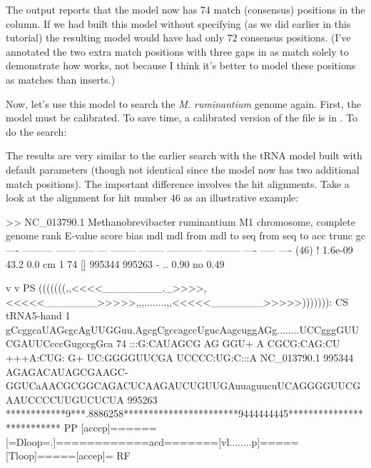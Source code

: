 The output reports that the model now has 74 match (consensus)
positions in the  column. If we had built this model
without specifying  (as we did earlier in this tutorial)
the resulting model would have had only 72 consensus positions.
(I've annotated the two extra match positions with three gaps in
 as match solely to demonstrate how
 works, not because I think it's better to model these
positions as matches than inserts.)

Now, let's use this model to search the \emph{M. ruminantium} genome
again. First, the model must be calibrated. To save time, a calibrated
version of the file is in . To do the
search:


The results are very similar to the earlier search with the
tRNA model built with default  parameters (though not
identical since the model now has two additional match positions). The
important difference involves the hit alignments. Take a look at the
alignment for hit number 46 as an illustrative example:

\newpage

\begin{widesreoutput}
>> NC_013790.1  Methanobrevibacter ruminantium M1 chromosome, complete genome
 rank     E-value  score  bias mdl mdl from   mdl to       seq from      seq to       acc trunc   gc
 ----   --------- ------ ----- --- -------- --------    ----------- -----------      ---- ----- ----
 (46) !   1.6e-09   43.2   0.0  cm        1       74 []      995344      995263 - .. 0.90    no 0.49

                                 v          v                                                            PS
                     (((((((,,<<<<________._>>>>,<<<<<_______>>>>>,,,........,,<<<<<_______>>>>>))))))): CS
   tRNA5-hand      1 gCcggcaUAGcgcAgUUGGuu.AgcgCgccagccUgucAagcuggAGg........UCCgggGUUCGAUUCcccGugccgGca 74    
                     :::G:CAUAGCG AG  GGU+ A CGCG:CAG:CU +++A:CUG: G+        UC:GGGGUUCGA UCCCC:UG:C:::A
  NC_013790.1 995344 AGAGACAUAGCGAAGC-GGUCaAACGCGGCAGACUCAAGAUCUGUUGAuuaguucuUCAGGGGUUCGAAUCCCCUUGUCUCUA 995263
                     ************9***.8886258***********************9444444445************************** PP
                     [accep]======[=Dloop=.]============acd=======[vl........p]=====[Tloop]=====[accep]= RF
\end{widesreoutput}

